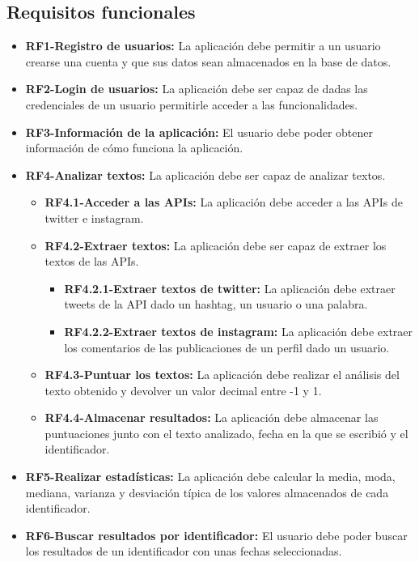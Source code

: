 \subsection{Requisitos funcionales}
\begin{itemize}
\tightlist
    \item \textbf{RF1-Registro de usuarios:} La aplicación debe permitir a un usuario crearse una cuenta y que sus datos sean almacenados en la base de datos.
    \item \textbf{RF2-Login de usuarios:} La aplicación debe ser capaz de dadas las credenciales de un usuario permitirle acceder a las funcionalidades.
    \item \textbf{RF3-Información de la aplicación:} El usuario debe poder obtener información de cómo funciona la aplicación.
    \item \textbf{RF4-Analizar textos:} La aplicación debe ser capaz de analizar textos.
        \begin{itemize}
        \tightlist
            \item \textbf{RF4.1-Acceder a las APIs:} La aplicación debe acceder a las APIs de twitter e instagram.
            \item \textbf{RF4.2-Extraer textos:} La aplicación debe ser capaz de extraer los textos de las APIs.
            \begin{itemize}
            \tightlist
                \item \textbf{RF4.2.1-Extraer textos de twitter:} La aplicación debe extraer tweets de la API dado un hashtag, un usuario o una palabra.
                \item \textbf{RF4.2.2-Extraer textos de instagram:} La aplicación debe extraer los comentarios de las publicaciones de un perfil dado un usuario.
            \end{itemize}
            \item \textbf{RF4.3-Puntuar los textos:} La aplicación debe realizar el análisis del texto obtenido y devolver un valor decimal entre -1 y 1.
            \item \textbf{RF4.4-Almacenar resultados:} La aplicación debe almacenar las puntuaciones junto con el texto analizado, fecha en la que se escribió y el identificador.
        \end{itemize}
        \item \textbf{RF5-Realizar estadísticas:} La aplicación debe calcular la media, moda, mediana, varianza y desviación típica de los valores almacenados de cada identificador.
        \item\textbf{RF6-Buscar resultados por identificador:} El usuario debe poder buscar los resultados de un identificador con unas fechas seleccionadas.

\end{itemize}

